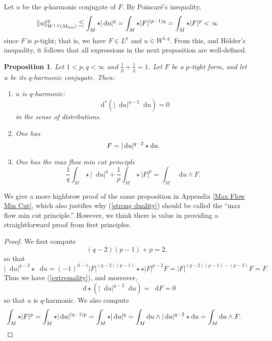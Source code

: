 \documentclass[reqno,11pt]{amsart}
\newcommand*\dif{\mathop{}\!\mathrm{d}}
\newcommand{\dfn}[1]{\emph{#1}\index{#1}}
\newtheorem{proposition}[theorem]{Proposition}
\theoremstyle{definition}
\numberwithin{equation}{section}
\begin{document}
Let $u$ be the $q$-harmonic conjugate of $F$.
By Poincar\'e's inequality,
$$\|u\|_{W^{1, q}(M_{\rm fun})}^q \lesssim \int_M \star |\dif u|^q = \int_M \star |F|^{(p - 1)q} = \int_M \star |F|^p < \infty$$
since $F$ is $p$-tight; that is, we have $F \in L^p$ and $u \in W^{1, q}$.
From this, and H\"older's inequality, it follows that all expressions in the next proposition are well-defined.

\begin{proposition}
Let $1 < p, q < \infty$ and $\frac{1}{p} + \frac{1}{q} = 1$.
Let $F$ be a $p$-tight form, and let $u$ be its $q$-harmonic conjugate. Then:
\begin{enumerate}
\item $u$ is $q$-harmonic:
$$\dif^*(|\dif u|^{q - 2} \dif u) = 0$$
in the sense of distributions.
\item One has 
\begin{equation}
F = |\dif u|^{q - 2} \star \dif u. \label{extremality} \\
\end{equation}
\item One has the \dfn{max flow min cut principle}
\begin{equation}\label{strong duality}
\frac{1}{q} \int_M \star |\dif u|^q + \frac{1}{p} \int_M \star |F|^p = \int_M \dif u \wedge F.
\end{equation}
\end{enumerate}
\end{proposition}

We give a more highbrow proof of the same proposition in Appendix \ref{Max Flow Min Cut}, which also justifies why (\ref{strong duality}) should be called the ``max flow min cut principle.''
However, we think there is value in providing a straightforward proof from first principles.

\begin{proof}
We first compute 
$$(q - 2)(p - 1) + p = 2,$$
so that
$$|\dif u|^{q - 2} \star \dif u = (-1)^{d - 1} |F|^{(q - 2)(p - 1)} \star \star |F|^{p - 2} F = |F|^{(q - 2)(p - 1) - (p - 2)} F = F.$$
Thus we have (\ref{extremality}), and moreover,
$$\dif \star (|\dif u|^{q - 2} \dif u) = \dif F = 0$$
so that $u$ is $q$-harmonic.
We also compute 
\begin{align*}
\int_M \star |F|^p &= \int_M \star |\dif u|^{(q - 1)p} = \int_M \star |\dif u|^q = \int_M \dif u \wedge |\dif u|^{q - 2} \star \dif u = \int_M \dif u \wedge F. \qedhere 
\end{align*}
\end{proof}
\end{document}
